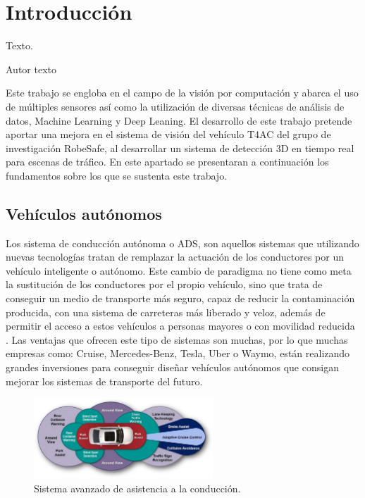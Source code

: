\chapter{Introducción}
\label{cha:Introducción}

\begin{FraseCelebre}
  \begin{Frase}
    Texto.
  \end{Frase}
  \begin{Fuente}
    Autor texto
  \end{Fuente}
\end{FraseCelebre}

\noindent
Este trabajo se engloba en el campo de la visión por computación y abarca el uso de múltiples sensores así como la utilización de diversas técnicas de análisis de datos, Machine Learning y Deep Leaning. El desarrollo de este trabajo pretende aportar una mejora en el sistema de visión del vehículo T4AC del grupo de investigación RobeSafe, al desarrollar un sistema de detección 3D en tiempo real para escenas de tráfico. En este apartado se presentaran a continuación los fundamentos sobre los que se sustenta este trabajo.

\section{Vehículos autónomos}
\label{sec:Vehículos autónomos}

Los sistema de conducción autónoma o \ac{ADS}, son aquellos sistemas que utilizando nuevas tecnologías tratan de remplazar la actuación de los conductores por un vehículo inteligente o autónomo. Este cambio de paradigma no tiene como meta la sustitución de los conductores por el propio vehículo, sino que trata de conseguir un medio de transporte más seguro, capaz de reducir la contaminación producida, con una sistema de carreteras más liberado y veloz, además de permitir el acceso a estos vehículos a personas mayores o con movilidad reducida \cite{autonomous_vehicles_1}. Las ventajas que ofrecen este tipo de sistemas son muchas, por lo que muchas empresas como: Cruise, Mercedes-Benz, Tesla, Uber o Waymo, están realizando grandes inversiones para conseguir diseñar vehículos autónomos que consigan mejorar los sistemas de transporte del futuro.

\begin{figure}[H]
    \centering
    \includegraphics[width=0.6\textwidth]{Book/figures/1_introduccion/ADAS_tech.png}
    \caption{Sistema avanzado de asistencia a la conducción.}
    \label{fig:Sistema avanzado de asistencia a la conducción.}
\end{figure}

